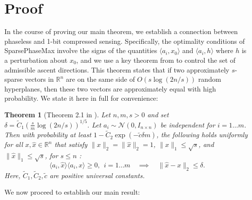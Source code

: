\documentclass[12pt]{article}
\newcommand{\1}{\mathbf{1}}
\DeclareMathOperator*{\sign}{\text{sgn}}
\newcommand{\xo}{x_0}
\newcommand{\R}{\mathbb{R}}
\newcommand{\xhat}{\hat{x}}
\newcommand{\ctilde}{\tilde{c}}
\newcommand{\Ctilde}{\tilde{C}}
\newtheorem{theorem}{Theorem} %
\begin{document}
\section{Proof}

In the course of proving our main theorem, we establish a connection between phaseless and 1-bit compressed sensing. Specifically, the optimality conditions of SparsePhaseMax involve the signs of the quantities $\langle a_i,x_0 \rangle$ and $\langle a_i,h \rangle$ where $h$ is a perturbation about $\xo$, and we use a key theorem from \cite{yaniv} to control the set of admissible ascent directions. This theorem states that if two approximately $s$-sparse vectors in $\R^n$ are on the same side of $O(s \log(2n/s))$ random hyperplanes, then these two vectors are approximately equal with high probability.  We state it here in full for convenience:


\begin{theorem}[Theorem 2.1 in \cite{yaniv}] \label{thm:yaniv}
Let $n,m,s > 0$ and set $\delta = \Ctilde_1\left( \frac{s}{m} \log(2n/s) \right)^{1/5}.$  Let $a_i \sim \mathcal{N}(0, I_{n \times n})$ be independent for $i = 1 \ldots m$.  Then with probability at least $1 - \Ctilde_2 \exp(-\ctilde \delta m)$, the following
holds uniformly for all $x, \xhat \in \R^n$ that satisfy $\|x\|_2 = \|\xhat\|_2 = 1$, $\|x\|_1 \leq \sqrt{s}$, and $\|\xhat\|_1 \leq \sqrt{s}$, for $s \leq n$ :
\[
\langle a_i, \xhat \rangle \langle a_i, x \rangle \geq 0 ,  \ \  i=1\ldots m  \quad \implies \quad  \| \xhat - x \|_2 \leq \delta.
\]
Here, $\Ctilde_1, \Ctilde_2, \ctilde$ are positive universal constants. 
\end{theorem}

We now proceed to establish our main result:
\end{document}
